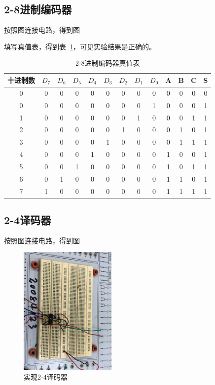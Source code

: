 \documentclass[a4paper,twoside]{ctexart}
\begin{document}
\begin{spacing}{1.2}
\subsection{2-8进制编码器}

按照图连接电路，得到图

填写真值表，得到表~\ref{tbl:resenc28}，可见实验结果是正确的。


\begin{table}[htbp]
	\centering
	\caption{2-8进制编码器真值表}
	\label{tbl:resenc28}
	\begin{tabular}{c|cccccccc|ccc|c}
		\toprule
		\hline 
		十进制数&$D_7$&$D_6$&$D_5$&$D_4$&$D_3$&$D_2$&$D_1$&$D_0$&A&B&C&S \\
		\hline
		0&0&0&0&0&0&0&0&0&0&0&0&0 \\
		0&0&0&0&0&0&0&0&1&0&0&0&1 \\
		1&0&0&0&0&0&0&1&0&0&0&1&1 \\
		2&0&0&0&0&0&1&0&0&0&1&0&1 \\
		3&0&0&0&0&1&0&0&0&0&1&1&1 \\
		4&0&0&0&1&0&0&0&0&1&0&0&1 \\
		5&0&0&1&0&0&0&0&0&1&0&1&1 \\
		6&0&1&0&0&0&0&0&0&1&1&0&1 \\
		7&1&0&0&0&0&0&0&0&1&1&1&1 \\
		\hline
		\bottomrule
	\end{tabular}
\end{table}


\subsection{2-4译码器}

按照图连接电路，得到图

\begin{figure}[htbp]
	\centering
	\caption{实现2-4译码器}
	\label{fig:resdec24}
	\includegraphics[width=0.42\textwidth,angle=90,origin=c]{images/32.JPG}
\end{figure}


\end{spacing}
\end{document}
